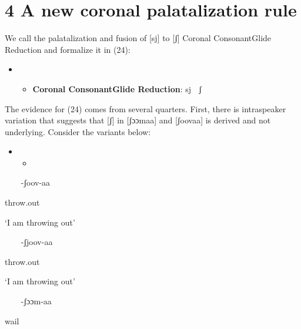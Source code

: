 \chapter{4 A new coronal palatalization rule}

We call the palatalization and fusion of [sj] to [ʃ] Coronal ConsonantGlide Reduction and formalize it in (24):

\setcounter{itemize}{0}
\begin{itemize}
\item \setcounter{itemize}{0}
\begin{itemize}
\item \textbf{Coronal ConsonantGlide Reduction}: sj  ʃ

\end{itemize}
\end{itemize}

The evidence for (24) comes from several quarters. First, there is intraspeaker variation that suggests that [ʃ] in [ʃɔɔmaa] and [ʃoovaa] is derived and not underlying. Consider the variants below:

\begin{itemize}
\item \setcounter{itemize}{0}
\begin{itemize}
\item \end{itemize}
\end{itemize}
\setcounter{itemize}{0}
\begin{itemize}
\item [-ʃoov-aa]

\end{itemize}

throw.out

‘I am throwing out’

\begin{itemize}
\item [-ʃjoov-aa]

\end{itemize}

throw.out

‘I am throwing out’

\begin{itemize}
\item [-ʃɔɔm-aa]

\end{itemize}

wail

